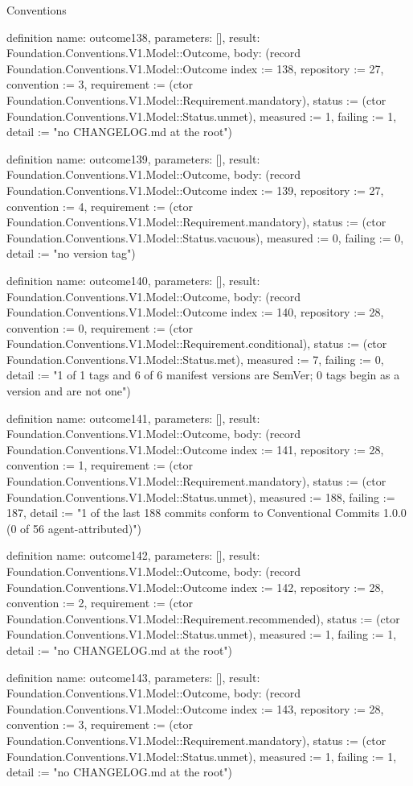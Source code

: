 \begin{lexlean}{Conventions}
\begin{semanticmodule}
definition{
  name: outcome138,
  parameters: [],
  result: Foundation.Conventions.V1.Model::Outcome,
  body: (record Foundation.Conventions.V1.Model::Outcome {index := 138, repository := 27, convention := 3, requirement := (ctor Foundation.Conventions.V1.Model::Requirement.mandatory), status := (ctor Foundation.Conventions.V1.Model::Status.unmet), measured := 1, failing := 1, detail := "no CHANGELOG.md at the root"})
}

definition{
  name: outcome139,
  parameters: [],
  result: Foundation.Conventions.V1.Model::Outcome,
  body: (record Foundation.Conventions.V1.Model::Outcome {index := 139, repository := 27, convention := 4, requirement := (ctor Foundation.Conventions.V1.Model::Requirement.mandatory), status := (ctor Foundation.Conventions.V1.Model::Status.vacuous), measured := 0, failing := 0, detail := "no version tag"})
}

definition{
  name: outcome140,
  parameters: [],
  result: Foundation.Conventions.V1.Model::Outcome,
  body: (record Foundation.Conventions.V1.Model::Outcome {index := 140, repository := 28, convention := 0, requirement := (ctor Foundation.Conventions.V1.Model::Requirement.conditional), status := (ctor Foundation.Conventions.V1.Model::Status.met), measured := 7, failing := 0, detail := "1 of 1 tags and 6 of 6 manifest versions are SemVer; 0 tags begin as a version and are not one"})
}

definition{
  name: outcome141,
  parameters: [],
  result: Foundation.Conventions.V1.Model::Outcome,
  body: (record Foundation.Conventions.V1.Model::Outcome {index := 141, repository := 28, convention := 1, requirement := (ctor Foundation.Conventions.V1.Model::Requirement.mandatory), status := (ctor Foundation.Conventions.V1.Model::Status.unmet), measured := 188, failing := 187, detail := "1 of the last 188 commits conform to Conventional Commits 1.0.0 (0 of 56 agent-attributed)"})
}

definition{
  name: outcome142,
  parameters: [],
  result: Foundation.Conventions.V1.Model::Outcome,
  body: (record Foundation.Conventions.V1.Model::Outcome {index := 142, repository := 28, convention := 2, requirement := (ctor Foundation.Conventions.V1.Model::Requirement.recommended), status := (ctor Foundation.Conventions.V1.Model::Status.unmet), measured := 1, failing := 1, detail := "no CHANGELOG.md at the root"})
}

definition{
  name: outcome143,
  parameters: [],
  result: Foundation.Conventions.V1.Model::Outcome,
  body: (record Foundation.Conventions.V1.Model::Outcome {index := 143, repository := 28, convention := 3, requirement := (ctor Foundation.Conventions.V1.Model::Requirement.mandatory), status := (ctor Foundation.Conventions.V1.Model::Status.unmet), measured := 1, failing := 1, detail := "no CHANGELOG.md at the root"})
}


\end{semanticmodule}
\end{lexlean}
